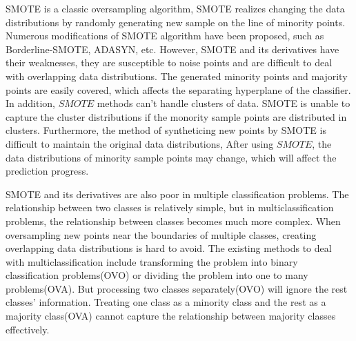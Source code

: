 \documentclass[ida]{iosart2x}
\begin{document}
SMOTE is a classic oversampling algorithm,
SMOTE realizes changing the data distributions by randomly generating new sample 
on the line of minority points.
Numerous modifications of SMOTE algorithm have been proposed, such as
Borderline-SMOTE\cite{2005Borderline}, ADASYN\cite{2008ADASYN}, etc. 
However, SMOTE and its derivatives have their weaknesses,
they are susceptible to noise points and are difficult to deal with
 overlapping data distributions.
The generated minority points and majority points are easily covered, 
which affects the separating hyperplane of the classifier. 
In addition, $SMOTE$ methods can't handle
clusters of data. SMOTE is unable to capture the cluster distributions
if the monority sample points are distributed in clusters.
Furthermore,
the method of syntheticing new points by SMOTE is difficult to 
maintain the original data distributions\cite{2008DATA},
After using $SMOTE$, 
the data distributions of minority sample points may change,
which will affect the prediction progress.


 SMOTE and its derivatives are also poor in multiple classification problems\cite{2020Combined}. 
 The relationship between two classes is relatively simple,
but in multiclassification problems, the relationship 
between classes becomes much more complex\cite{2017Relevance}.
When oversampling new points near the boundaries of multiple classes, 
creating overlapping data distributions\cite{Jierui2013Overlapping} is hard to avoid.
The existing methods to deal with multiclassification include transforming 
the problem into binary classification problems(OVO)\cite{articlemulti} or 
dividing the problem into one to many problems(OVA).
But processing two classes separately(OVO) will ignore the rest classes' information.
Treating one class as a minority class and the rest as a majority class(OVA)
cannot capture the relationship between majority classes effectively.
\end{document}
